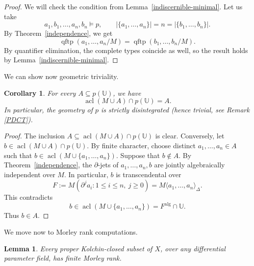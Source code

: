\documentclass[10pt,a4paper]{amsart}
\newtheorem{lemma}[theorem]{Lemma}
\newtheorem{corollary}[theorem]{Corollary}
\newcommand{\acl}{\operatorname{acl}}
\newcommand{\Ucal}{{\mathds{U}}}
\begin{document}
\begin{proof}
We will check the condition from Lemma~\ref{indiscernible-minimal}. Let us take
\[
a_1,b_1,\ldots,a_n,b_n\models p,\qquad |\{a_1,\ldots,a_n\}|=n=|\{b_1,\ldots,b_n\}|.
\]
By Theorem~\ref{independence}, we get
\[
\operatorname{qftp}(a_1,\ldots,a_n/M)=\operatorname{qftp}(b_1,\ldots,b_n/M).
\]
By quantifier elimination, the complete types coincide as well, so the result holds by Lemma~\ref{indiscernible-minimal}.
\end{proof}
We can show now geometric triviality.
\begin{corollary}\label{triviality}
For every $A\subseteq p(\Ucal)$, we have
\[
 \acl(M\cup A)\cap p(\Ucal)=A.
\]
In particular, the geometry of $p$ is strictly disintegrated (hence trivial, see Remark \ref{PDCT}).
\end{corollary}
\begin{proof}
The inclusion $A\subseteq\acl(M\cup A)\cap p(\Ucal)$ is clear.
Conversely, let $b\in\acl(M\cup A)\cap p(\Ucal)$.
By finite character, choose distinct $a_1,\ldots,a_n\in A$
such that $b\in\acl(M\cup \{a_1,\ldots, a_n\})$.
Suppose that $b\notin A$. By Theorem~\ref{independence},
the $\partial$-jets of $a_1,\ldots,a_n,b$ are jointly
algebraically independent over $M$. In particular, $b$
is transcendental over
\[
F:=M(\partial^j a_i:1\leqslant i\leqslant n,\ j\geqslant0)
  =M\langle a_1,\ldots,a_n\rangle_\Delta.
\]
This contradicts
\[
b\in\acl(M\cup \{a_1,\ldots, a_n\})=F^{\mathrm{alg}}\cap\Ucal.
\]
Thus $b\in A$.
\end{proof}

We move now to Morley rank computations.
\begin{lemma}\label{proper-finite}
Every proper Kolchin-closed subset of $X$, over any differential
parameter field, has finite Morley rank.
\end{lemma}
\end{document}
